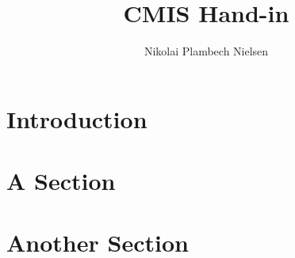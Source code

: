 \documentclass[sigconf]{acmart}
\begin{document}
%
\title{CMIS Hand-in}

\author{Nikolai Plambech Nielsen}


\maketitle

\section{Introduction}

\lipsum[1-3]

\section{A Section}

\lipsum[1-3]

\section{Another Section}

\lipsum[1-3]
\end{document}
